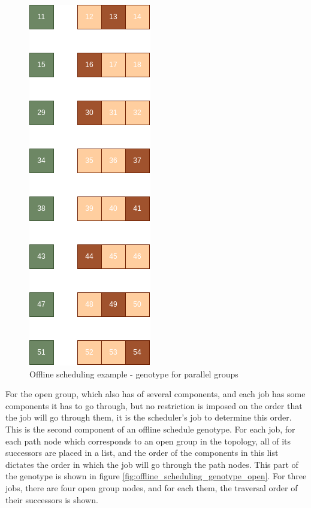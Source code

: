 \begin{figure}[!htbp]
	\centering
	\includegraphics[scale=0.6]{../images/offline_scheduling_genotype_parallel.png}
	\caption{Offline scheduling example - genotype for parallel groups}
    \label{fig:offline_scheduling_genotype_parallel}
\end{figure}

For the open group, which also has of several components, and each job has some components it has to go through, but no restriction is imposed on the order that the job will go through them, it is the scheduler's job to determine this order. This is the second component of an offline schedule genotype. For each job, for each path node which corresponds to an open group in the topology, all of its successors are placed in a list, and the order of the components in this list dictates the order in which the job will go through the path nodes. This part of the genotype is shown in figure \ref{fig:offline_scheduling_genotype_open}. For three jobs, there are four open group nodes, and for each them, the traversal order of their successors is shown.

